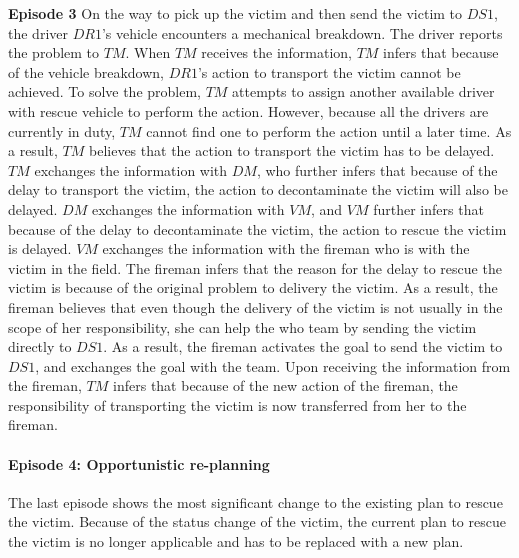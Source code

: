\begin{scenario}
\footnotesize
\textbf{Episode 3} On the way to pick up the victim and then send the victim to $DS1$, the driver $DR1$'s vehicle encounters a mechanical breakdown. The driver reports the problem to $TM$. When $TM$ receives the information, $TM$ infers that because of the vehicle breakdown, $DR1$'s action to transport the victim cannot be achieved. To solve the problem, $TM$ attempts to assign another available driver with rescue vehicle to perform the action. However, because all the drivers are currently in duty, $TM$ cannot find one to perform the action until a later time. As a result, $TM$ believes that the action to transport the victim has to be delayed. $TM$ exchanges the information with $DM$, who further infers that because of the delay to transport the victim, the action to decontaminate the victim will also be delayed. $DM$ exchanges the information with $VM$, and $VM$ further infers that because of the delay to decontaminate the victim, the action to rescue the victim is delayed. $VM$ exchanges the information with the fireman who is with the victim in the field. The fireman infers that the reason for the delay to rescue the victim is because of the original problem to delivery the victim. As a result, the fireman believes that even though the delivery of the victim is not usually in the scope of her responsibility, she can help the who team by sending the victim directly to $DS1$. As a result, the fireman activates the goal to send the victim to $DS1$, and exchanges the goal with the team. Upon receiving the information from the fireman, $TM$ infers that because of the new action of the fireman, the responsibility of transporting the victim is now transferred from her to the fireman. 
\end{scenario}

\paragraph*{Episode 4: Opportunistic re-planning} %
\label{par:episode_4_opportunistic_re_planning}
The last episode shows the most significant change to the existing plan to rescue the victim. Because of the status change of the victim, the current plan to rescue the victim is no longer applicable and has to be replaced with a new plan.

